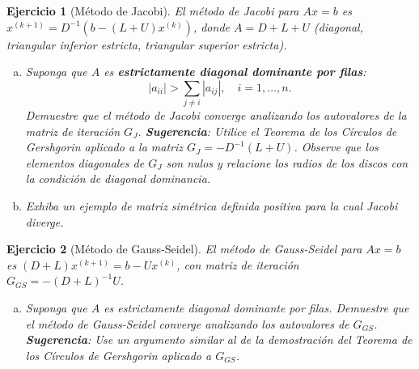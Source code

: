 \documentclass[12pt]{article}
\newtheorem{exercise}{Ejercicio}
\begin{document}
\begin{exercise}[Método de Jacobi]
El método de Jacobi para $Ax = b$ es $x^{(k+1)} = D^{-1}(b - (L+U)x^{(k)})$, donde $A = D + L + U$ (diagonal, triangular inferior estricta, triangular superior estricta).
\begin{enumerate}[(a)]
\item Suponga que $A$ es \textbf{estrictamente diagonal dominante por filas}:
\[
|a_{ii}| > \sum_{j \neq i} |a_{ij}|, \quad i = 1, \ldots, n.
\]
Demuestre que el método de Jacobi converge analizando los autovalores de la matriz de iteración $G_J$.
\textbf{Sugerencia}: Utilice el Teorema de los Círculos de Gershgorin aplicado a la matriz $G_J = -D^{-1}(L+U)$. Observe que los elementos diagonales de $G_J$ son nulos y relacione los radios de los discos con la condición de diagonal dominancia.
\item Exhiba un ejemplo de matriz simétrica definida positiva para la cual Jacobi diverge.
\end{enumerate}
\end{exercise}

\begin{exercise}[Método de Gauss-Seidel]
El método de Gauss-Seidel para $Ax = b$ es $(D+L)x^{(k+1)} = b - Ux^{(k)}$, con matriz de iteración $G_{GS} = -(D+L)^{-1}U$.
\begin{enumerate}[(a)]
\item Suponga que $A$ es estrictamente diagonal dominante por filas. Demuestre que el método de Gauss-Seidel converge analizando los autovalores de $G_{GS}$.
\textbf{Sugerencia}: Use un argumento similar al de la demostración del Teorema de los Círculos de Gershgorin aplicado a $G_{GS}$.
\end{enumerate}
\end{exercise}


\end{document}
